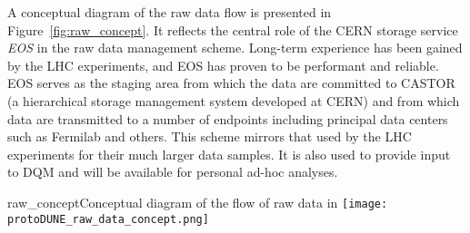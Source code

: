 A conceptual diagram of the raw data flow is presented in
Figure~\ref{fig:raw_concept}.  It reflects the central role of the
CERN storage service \textit{EOS} in the raw data management scheme.
Long-term experience has been gained by the LHC experiments, and EOS
has proven to be performant and reliable.  EOS serves as the staging
area from which the data are committed to CASTOR (a hierarchical
storage management system developed at CERN) and from which data are
transmitted to a number of endpoints including principal data centers
such as Fermilab and others.  This scheme mirrors that used by the LHC experiments for their much larger data samples. It is also used to provide input to DQM
and will be available for personal ad-hoc analyses.

\begin{cdrfigure}{raw_concept}{Conceptual diagram of the flow of raw data in \pdsp} 
\texttt{[image: protoDUNE\_raw\_data\_concept.png]}
\end{cdrfigure}


